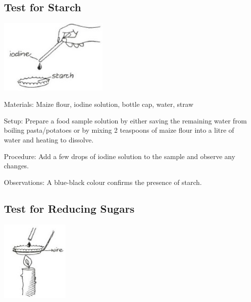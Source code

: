 \begin{multicols}{2}
\subsection{Test for Starch} %

\begin{center}
\includegraphics[width=0.4\textwidth]{./img/vso/food-test-starch.jpg}
\end{center}

\begin{description*}
\item[Materials:]{Maize flour, iodine solution, bottle cap, water, straw}
\item[Setup:]{Prepare a food sample solution by either saving the remaining water from boiling pasta/potatoes or by mixing 2 teaspoons of maize flour into a litre of water and heating to dissolve.}
\item[Procedure:]{Add a few drops of iodine solution to the sample and observe any changes.}
\item[Observations:]{A blue-black colour confirms the presence of starch.}
\end{description*}

\subsection{Test for Reducing Sugars} %

\begin{center}
\includegraphics[width=0.25\textwidth]{./img/vso/food-test-reducing.jpg}
\end{center}


\end{multicols}
